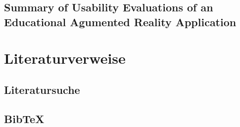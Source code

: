 \documentclass[deutsch]{llncs}
\begin{document}
\subsection{Summary of Usability Evaluations of an Educational Agumented Reality Application}



\section{Literaturverweise}
\label{sec:bib}

\subsection{Literatursuche}
\label{subsec:search}


\subsection{BibTeX}
\label{subsec:bibtex}


\printbibliography
\end{document}
